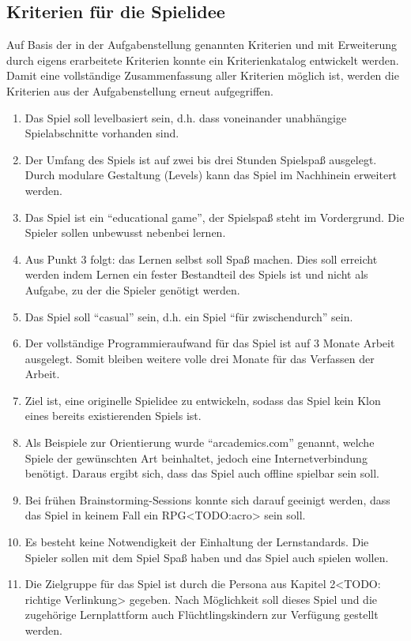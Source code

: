 \subsection{Kriterien für die Spielidee}\label{ssec:kriterien}
	Auf Basis der in der Aufgabenstellung genannten Kriterien und mit Erweiterung durch eigens erarbeitete Kriterien konnte ein Kriterienkatalog entwickelt werden. Damit eine vollständige Zusammenfassung aller Kriterien möglich ist, werden die Kriterien aus der Aufgabenstellung erneut aufgegriffen.
	\begin{enumerate}
		\item{Das Spiel soll levelbasiert sein, d.h. dass voneinander unabhängige Spielabschnitte vorhanden sind.}
		\item{Der Umfang des Spiels ist auf zwei bis drei Stunden Spielspaß ausgelegt. Durch modulare Gestaltung (Levels) kann das Spiel im Nachhinein erweitert werden.}
		\item{Das Spiel ist ein \enquote{educational game}, der Spielspaß steht im Vordergrund. Die Spieler sollen unbewusst nebenbei lernen.}
		\item{Aus Punkt 3 folgt: das Lernen selbst soll Spaß machen. Dies soll erreicht werden indem Lernen ein fester Bestandteil des Spiels ist und nicht als Aufgabe, zu der die Spieler genötigt werden.}
		\item{Das Spiel soll \enquote{casual} sein, d.h. ein Spiel \enquote{für zwischendurch} sein.}
		\item{Der vollständige Programmieraufwand für das Spiel ist auf 3 Monate Arbeit ausgelegt. Somit bleiben weitere volle drei Monate für das Verfassen der Arbeit.}
		\item{Ziel ist, eine originelle Spielidee zu entwickeln, sodass das Spiel kein Klon eines bereits existierenden Spiels ist.}
		\item{Als Beispiele zur Orientierung wurde \enquote{arcademics.com} genannt, welche Spiele der gewünschten Art beinhaltet, jedoch eine Internetverbindung benötigt. Daraus ergibt sich, dass das Spiel auch offline spielbar sein soll.}
		\item{Bei frühen Brainstorming-Sessions konnte sich darauf geeinigt werden, dass das Spiel in keinem Fall ein RPG<TODO:acro> sein soll.}
		\item{Es besteht keine Notwendigkeit der Einhaltung der Lernstandards. Die Spieler sollen mit dem Spiel Spaß haben und das Spiel auch spielen wollen.}
		\item{Die Zielgruppe für das Spiel ist durch die Persona aus Kapitel 2<TODO: richtige Verlinkung> gegeben. Nach Möglichkeit soll dieses Spiel und die zugehörige Lernplattform auch Flüchtlingskindern zur Verfügung gestellt werden.}
	\end{enumerate}

